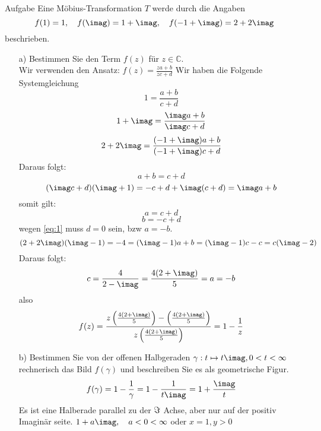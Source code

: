 \documentclass{scrartcl}
\def\mbb#1{\mathbb{#1}}
\def\bC{\mbb{C}}
\begin{document}
\begin{section}{Aufgabe}%
Eine Möbius-Transformation $T$ werde durch die Angaben
\[f(1)=1,\quad f(\imag)=1+\imag,\quad f(-1+\imag)=2+2\imag\]
beschrieben.
\begin{itemize}
\item[a)]
Bestimmen Sie den Term $f(z)$ für $z \in \bC$.\\
Wir verwenden den Ansatz: \(f(z)=\frac{z a+b}{z c+d}\)
Wir haben die Folgende Systemgleichung
\[1=\frac{a+b}{c+d}\]
\[1+\imag=\frac{\imag a+b}{\imag c+d}\]
\[2+2\imag=\frac{(-1+\imag)a+b}{(-1+\imag)c+d}\]
Daraus folgt:
\begin{equation}
    a+b=c+d \label{eq:1}
\end{equation}
\[(\imag c+d)(\imag+1)=-c+d+\imag(c+d)=\imag a+b\]
somit gilt:
\[a=c+d\]
\[b=-c+d\]
wegen \eqref{eq:1} muss $d=0$ sein, bzw $a=-b$.
\[(2+2\imag)(\imag-1)=-4=(\imag-1)a+b=(\imag-1)c-c=c(\imag-2)\]
Daraus folgt:
\[c=\frac{4}{2-\imag}=\frac{4 (2+\imag)}{5}=a=-b\]
also
\[f(z)=\frac{z \left(\frac{4 (2+\imag)}{5}\right)-\left(\frac{4 (2+\imag)}{5}\right)}{z \left(\frac{4 (2+\imag)}{5}\right)}=1-\frac{1}{z}\]
\item[b)]
Bestimmen Sie von der offenen Halbgeraden $\gamma : t \mapsto t \imag, 0 < t < \infty$ rechnerisch
das Bild $f(\gamma)$ und beschreiben Sie es als geometrische Figur.
\[f(\gamma)=1-\frac{1}{\gamma}=1-\frac{1}{t \imag}=1+\frac{\imag}{t}\]
Es ist eine Halberade parallel zu der $\imaginary$ Achse, aber nur auf der positiv Imaginär seite. $1+a \imag,\quad a<0<\infty$
oder $x=1,y>0$



\end{itemize}
\end{section}
\end{document}
